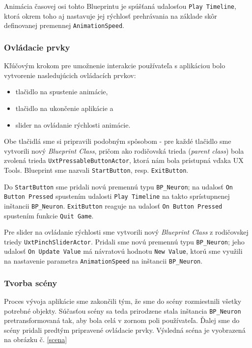 Animácia časovej osi tohto Blueprintu je spúšťaná udalosťou \texttt{Play Timeline}, ktorá okrem toho aj nastavuje jej rýchlosť prehrávania na základe skôr definovanej premennej \texttt{AnimationSpeed}.

\subsubsection{Ovládacie prvky}
Kľúčovým krokom pre umožnenie interakcie používateľa s aplikáciou bolo vytvorenie nasledujúcich ovládacích prvkov:

\begin{itemize}
  \item tlačidlo na spustenie animácie,
  \item tlačidlo na ukončenie aplikácie a 
  \item slider na ovládanie rýchlosti animácie.
\end{itemize}

Obe tlačidlá sme si pripravili podobným spôsobom - pre každé tlačidlo sme vytvorili nový \emph{Blueprint Class}, pričom ako rodičovská trieda (\emph{parent class}) bola zvolená trieda \texttt{UxtPressableButtonActor}, ktorá nám
bola prístupná vďaka UX Tools. Blueprint sme nazvali \texttt{StartButton}, resp. \texttt{ExitButton}. 

Do \texttt{StartButton} sme pridali novú premennú typu \texttt{BP\_Neuron}; na udalosť \texttt{On Button Pressed} spustením udalosti \texttt{Play Timeline} na takto sprístupnenej inštancii \texttt{BP\_Neuron}.
\texttt{ExitButton} reaguje na udalosť \texttt{On Button Pressed} spustením funkcie \texttt{Quit Game}.

Pre slider na ovládanie rýchlosti sme vytvorili nový \emph{Blueprint Class} z rodičovskej triedy \texttt{UxtPinchSliderActor}. Pridali sme novú premennú typu \texttt{BP\_Neuron}; jeho udalosť \texttt{On Update Value} má návratovú
hodnotu \texttt{New Value}, ktorú sme využili na nastavenie parametra \texttt{AnimationSpeed} na inštancii \texttt{BP\_Neuron}.

\subsubsection{Tvorba scény}
Proces vývoja aplikácie sme zakončili tým, že sme do scény rozmiestnili všetky potrebné objekty. Súčasťou scény sa teda prirodzene stala inštancia \texttt{BP\_Neuron} pretransformovaná tak, aby bola celá v zornom poli používateľa.
Ďalej sme do scény pridali predtým pripravené ovládacie prvky. Výsledná scéna je vyobrazená na obrázku č. \ref{scena}


